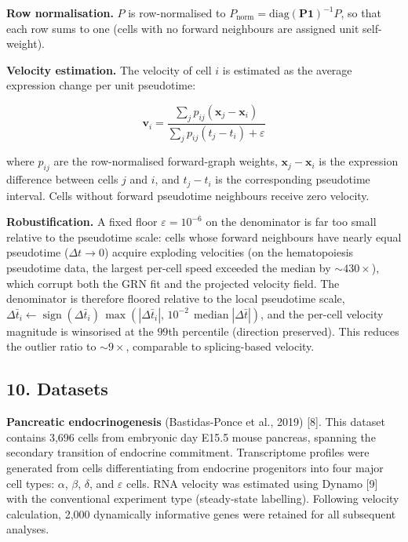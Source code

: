 \documentclass[11pt]{article}
\begin{document}
\textbf{Row normalisation.} $P$ is row-normalised to $P_{\text{norm}} = \mathrm{diag}(\mathbf{P}\mathbf{1})^{-1} P$, so that each row sums to one (cells with no forward neighbours are assigned unit self-weight).

\textbf{Velocity estimation.} The velocity of cell $i$ is estimated as the average expression change per unit pseudotime:


\begin{equation}
\mathbf{v}_i = \frac{\displaystyle\sum_j p_{ij}\left(\mathbf{x}_j - \mathbf{x}_i\right)}{\displaystyle\sum_j p_{ij}\left(t_j - t_i\right) + \varepsilon} 
\end{equation}


where $p_{ij}$ are the row-normalised forward-graph weights, $\mathbf{x}_j - \mathbf{x}_i$ is the expression difference between cells $j$ and $i$, and $t_j - t_i$ is the corresponding pseudotime interval. Cells without forward pseudotime neighbours receive zero velocity.

\textbf{Robustification.} A fixed floor $\varepsilon = 10^{-6}$ on the denominator is far too small relative to the pseudotime scale: cells whose forward neighbours have nearly equal pseudotime ($\Delta t \to 0$) acquire exploding velocities (on the hematopoiesis pseudotime data, the largest per-cell speed exceeded the median by $\sim\!430\times$), which corrupt both the GRN fit and the projected velocity field. The denominator is therefore floored relative to the local pseudotime scale, $\Delta \bar t_i \leftarrow \operatorname{sign}(\Delta \bar t_i)\,\max(|\Delta \bar t_i|,\, 10^{-2}\,\operatorname{median}|\Delta \bar t|)$, and the per-cell velocity magnitude is winsorised at the $99$th percentile (direction preserved). This reduces the outlier ratio to $\sim\!9\times$, comparable to splicing-based velocity.



\subsection*{10. Datasets}

\textbf{Pancreatic endocrinogenesis} (Bastidas-Ponce et al., 2019) [8]. This dataset contains 3,696 cells from embryonic day E15.5 mouse pancreas, spanning the secondary transition of endocrine commitment. Transcriptome profiles were generated from cells differentiating from endocrine progenitors into four major cell types: $\alpha$, $\beta$, $\delta$, and $\varepsilon$ cells. RNA velocity was estimated using Dynamo [9] with the conventional experiment type (steady-state labelling). Following velocity calculation, 2,000 dynamically informative genes were retained for all subsequent analyses.
\end{document}
